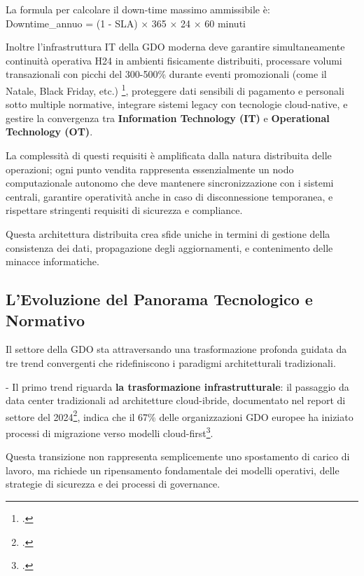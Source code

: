 La formula per calcolare il down-time massimo ammissibile è:\\
Downtime\_annuo = (1 - SLA) × 365 × 24 × 60 minuti

Inoltre l'infrastruttura IT della GDO moderna deve garantire simultaneamente
continuità operativa H24 in ambienti fisicamente distribuiti, processare
volumi transazionali con picchi del 300-500\% durante eventi
promozionali (come il Natale, Black Friday, etc.) \footcite{verizon2024dbir}, proteggere dati sensibili di pagamento e personali sotto multiple normative, integrare sistemi legacy con tecnologie
cloud-native, e gestire la convergenza tra \textbf{Information Technology (IT)} e
\textbf{Operational Technology (OT)}.

La complessità di questi requisiti è amplificata dalla natura
distribuita delle operazioni; ogni punto vendita rappresenta
essenzialmente un nodo computazionale autonomo che deve mantenere
sincronizzazione con i sistemi centrali, garantire operatività anche in
caso di disconnessione temporanea, e rispettare stringenti requisiti di
sicurezza e compliance.

Questa architettura distribuita crea sfide uniche in termini di gestione
della consistenza dei dati, propagazione degli aggiornamenti, e
contenimento delle minacce informatiche.

\subsection{\texorpdfstring{\textbf{L'Evoluzione del Panorama
Tecnologico e
Normativo}}{L'Evoluzione del Panorama Tecnologico e Normativo}}\label{levoluzione-del-panorama-tecnologico-e-normativo}

Il settore della GDO sta attraversando una trasformazione profonda
guidata da tre trend convergenti che ridefiniscono i paradigmi
architetturali tradizionali.

- Il primo trend riguarda \textbf{la trasformazione infrastrutturale}:
il passaggio da data center tradizionali ad architetture cloud-ibride,
documentato nel report di settore del 2024\footcite{gartner2024marketguide}, indica che il 67\% delle
organizzazioni GDO europee ha iniziato processi di migrazione verso
modelli cloud-first\footcite{eurostat2024digital}.

Questa transizione non rappresenta semplicemente uno spostamento di
carico di lavoro, ma richiede un ripensamento fondamentale dei modelli
operativi, delle strategie di sicurezza e dei processi di governance.


